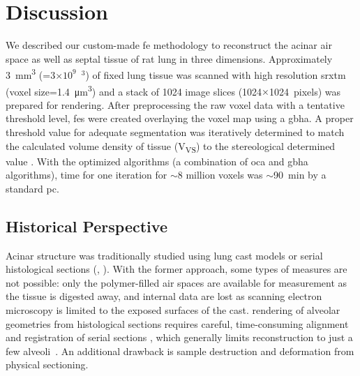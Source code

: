 \section{Discussion}\label{sec:discussion}
We described our custom-made \ac{fe} methodology to reconstruct the acinar air space as well as septal tissue of rat lung in three dimensions. Approximately \SI{3}{\milli\meter\cubed} (=3$\times10^9$~\micro\meter$^3$) of fixed lung tissue was scanned with high resolution \ac{srxtm} (voxel size=\SI{1.4}{\micro\meter\cubed}) and a stack of 1024 image slices (1024$\times$1024~pixels) was prepared for \threed rendering. After preprocessing the raw voxel data with a tentative threshold level, \threed \acp{fe} were created overlaying the voxel map using a \ac{gbha}. A proper threshold value for adequate segmentation was iteratively determined to match the calculated volume density of tissue (V\textsubscript{VS}) to the stereological determined value \cite{Tschanz2003}. With the optimized algorithms (a combination of \ac{oca} and \ac{gbha} algorithms),  time for one iteration for $\sim$8 million voxels was $\sim$\SI{90}{\minute} by a standard \ac{pc}.

\subsection{Historical Perspective}
Acinar structure was traditionally studied using lung cast models \cite{Boyden1971,Haefeli1988,Schreider1981} or serial histological sections (\eg, \cite{Berend1991,Hansen1975,Hansen1975a,Parker1971,Randell1989}). With the former approach, some types of measures are not possible: only the polymer-filled air spaces are available for measurement as the tissue is digested away, and internal data are lost as scanning electron microscopy is limited to the exposed surfaces of the cast. \threed rendering of alveolar geometries from histological sections requires careful, time-consuming alignment and registration of serial \twod sections \cite{Mercer1987,Mercer1987a,Stelter1966}, which generally limits reconstruction to just a few alveoli~\cite{Mercer1987}. An additional drawback is sample destruction and deformation from physical sectioning.

